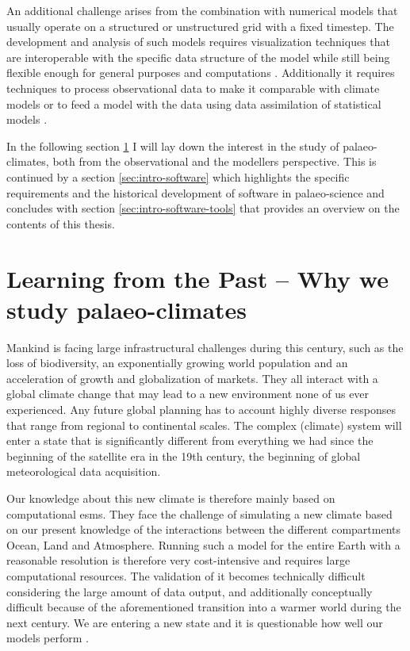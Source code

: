 \begin{refsection}
An additional challenge arises from the combination with numerical models that usually operate on a structured \citep{Edwards2010,TreutSomervilleCubaschEtAl2007} or unstructured \addref[ICON] grid with a fixed timestep. The development and analysis of such models requires visualization techniques that are interoperable with the specific data structure of the model \citep[e.g.][]{RewDavis1990, BrownFolkGoucherEtAl1993} while still being flexible enough for general purposes and computations \citep{Sommer2017, HoyerHamman2017}. Additionally it requires techniques to process observational data to make it comparable with climate models \citep{MauriDavisCollinsEtAl2015}  or to feed a model with the data using data assimilation of statistical models \citep{SommerKaplan2017b}.

In the following section \ref{sec:intro-palaeo} I will lay down the interest in the study of palaeo-climates, both from the observational and the modellers perspective. This is continued by a section \ref{sec:intro-software} which highlights the specific requirements and the historical development of software in palaeo-science and concludes with section \ref{sec:intro-software-tools} that provides an overview on the contents of this thesis.

\section{Learning from the Past – Why we study palaeo-climates} \label{sec:intro-palaeo}

Mankind is facing large infrastructural challenges during this century, such as the loss of biodiversity\addref, an exponentially growing world population \addref and an acceleration of growth and globalization of markets. They all interact with a global climate change that may lead to a new environment none of us ever experienced. Any future global planning has to account highly diverse responses that range from regional to continental scales. The complex (climate) system will enter a state that is significantly different from everything we had since the beginning of the satellite era in the 19th century, the beginning of global meteorological data acquisition\addref.

Our knowledge about this new climate is therefore mainly based on computational \glspl{esm}. They face the challenge of simulating a new climate based on our present knowledge of the interactions between the different compartments Ocean, Land and Atmosphere. Running such a model for the entire Earth with a reasonable resolution is therefore very cost-intensive and requires large computational resources. The validation of it becomes technically difficult considering the large amount of data output, and additionally conceptually difficult because of the aforementioned transition into a warmer world during the next century. We are entering a new state and it is questionable how well our models perform \citep{UldenOldenborgh2006, Karpechko2010, HargreavesAnnanOhgaitoEtAl2013}.


\end{refsection}
